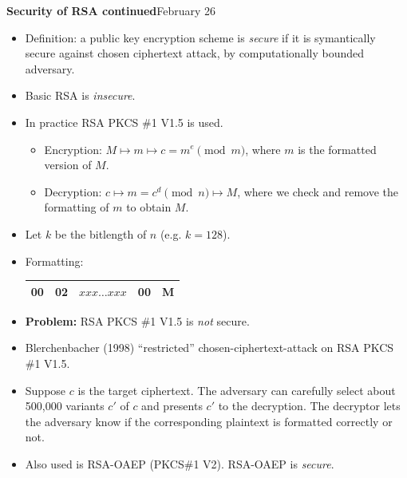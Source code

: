 \documentclass[a4paper,12pt]{article}
\begin{document}
\clearpage
{\bf Security of RSA continued}\hfill February 26
\begin{itemize}\renewcommand{\labelitemii}{$\circ$}
\item
Definition: a public key encryption scheme is {\it secure} if it is symantically secure against chosen ciphertext attack, by computationally bounded adversary.
\item
Basic RSA is {\it insecure}.
\item
In practice RSA PKCS \#1 V1.5 is used.
\begin{itemize}
\item
Encryption: $M \mapsto m \mapsto c=m^e \pmod m$, where $m$ is the formatted version of $M$.
\item
Decryption: $c \mapsto m = c^d \pmod n \mapsto M$, where we check and remove the formatting of $m$ to obtain $M$.
\end{itemize}
\item
Let $k$ be the bitlength of $n$ (e.g. $k=128$).
\item
Formatting:
\begin{center}
\begin{tabular}{|c|c|c|c|c|}
\hline
00 & 02 & $xxx \ldots xxx$ & 00 & M\\
\hline
\end{tabular}
\end{center}
\item
{\bf Problem:} RSA PKCS \#1 V1.5 is {\it not} secure.
\item
Blerchenbacher (1998) ``restricted'' chosen-ciphertext-attack on RSA PKCS \#1 V1.5.
\item
Suppose $c$ is the target ciphertext.  The adversary can carefully select about 500,000 variants $c'$ of $c$ and presents $c'$ to the decryption.  The decryptor lets the adversary know if the corresponding plaintext is formatted correctly or not.
\item
Also used is RSA-OAEP (PKCS\#1 V2).  RSA-OAEP is {\it secure}.
\end{itemize}
\end{document}
